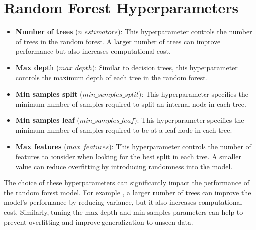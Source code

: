 \documentclass[conference]{IEEEtran}
\begin{document}
\section*{Random Forest Hyperparameters}
\begin{itemize}
    \item \textbf{Number of trees} ($n\_estimators$): This hyperparameter controls the number of trees in the random forest. A larger number of trees can improve performance but also increases computational cost.
    \item \textbf{Max depth} ($max\_depth$): Similar to decision trees, this hyperparameter controls the maximum depth of each tree in the random forest.
    \item \textbf{Min samples split} ($min\_samples\_split$): This hyperparameter specifies the minimum number of samples required to split an internal node in each tree.
    \item \textbf{Min samples leaf} ($min\_samples\_leaf$): This hyperparameter specifies the minimum number of samples required to be at a leaf node in each tree.
    \item \textbf{Max features} ($max\_features$): This hyperparameter controls the number of features to consider when looking for the best split in each tree. A smaller value can reduce overfitting by introducing randomness into the model.
\end{itemize}
The choice of these hyperparameters can significantly impact the performance of the random forest model. For example
, a larger number of trees can improve the model's performance by reducing variance, but it also increases computational cost. Similarly, tuning the max depth and min samples parameters can help to prevent overfitting and improve generalization to unseen data.
\end{document}
